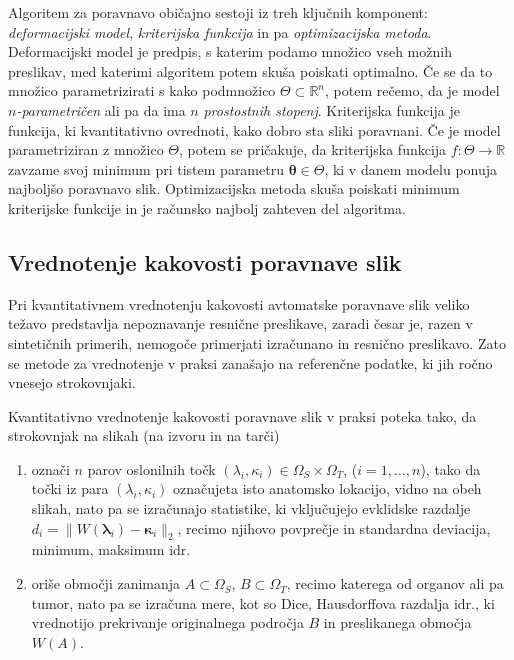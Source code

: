 \documentclass[journal]{IEEEtran}
\begin{document}
Algoritem za poravnavo običajno sestoji iz treh ključnih komponent: \emph{deformacijski model}, \emph{kriterijska funkcija} in pa \emph{optimizacijska metoda}. Deformacijski model je predpis, s katerim podamo množico vseh možnih preslikav, med katerimi algoritem potem skuša poiskati optimalno. Če se da to množico parametrizirati s kako podmnožico $\Theta\subset\mathbb{R}^n$, potem rečemo, da je model \emph{$n$-parametričen} ali pa da ima $n$ \emph{prostostnih stopenj}. Kriterijska funkcija je funkcija, ki kvantitativno ovrednoti, kako dobro sta sliki poravnani. Če je model parametriziran z množico $\Theta$, potem se pričakuje, da kriterijska funkcija $f\colon\Theta\to\mathbb{R}$ zavzame svoj minimum pri tistem parametru $\boldsymbol{\theta}\in\Theta$, ki v danem modelu ponuja najboljšo poravnavo slik. Optimizacijska metoda skuša poiskati minimum kriterijske funkcije in je računsko najbolj zahteven del algoritma.

\subsection{Vrednotenje kakovosti poravnave slik}

Pri kvantitativnem vrednotenju kakovosti avtomatske poravnave slik veliko težavo predstavlja nepoznavanje resnične preslikave, zaradi česar je, razen v sintetičnih primerih, nemogoče primerjati izračunano in resnično preslikavo. Zato se metode za vrednotenje v praksi zanašajo na referenčne podatke, ki jih ročno vnesejo strokovnjaki.

Kvantitativno vrednotenje kakovosti poravnave slik v praksi poteka tako, da strokovnjak na slikah (na izvoru in na tarči)
\begin{enumerate}
\item označi $n$ parov oslonilnih točk $(\lambda_i,\kappa_i)\in\Omega_S\times\Omega_T$, ($i=1,\dots,n$), tako da točki iz para $(\lambda_i, \kappa_i)$ označujeta isto anatomsko lokacijo, vidno na obeh slikah, nato pa se izračunajo statistike, ki vključujejo evklidske razdalje $d_i=\|W(\boldsymbol{\lambda}_i)-\boldsymbol{\kappa}_i\|_2$, recimo njihovo povprečje in standardna deviacija, minimum, maksimum idr.
\item oriše območji zanimanja $A\subset\Omega_S$, $B\subset\Omega_T$, recimo katerega od organov ali pa tumor, nato pa se izračuna mere, kot so Dice, Hausdorffova razdalja idr., ki vrednotijo prekrivanje originalnega področja $B$ in preslikanega območja $W(A)$.
\end{enumerate}
\end{document}
